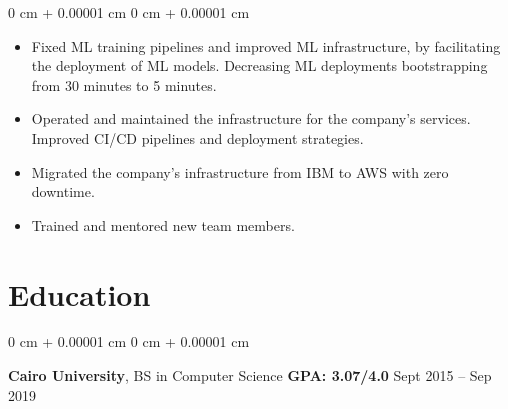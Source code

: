 \documentclass[10pt, letterpaper]{article}
\newenvironment{highlights}{
    \begin{itemize}[
        topsep=0.10 cm,
        parsep=0.10 cm,
        partopsep=0pt,
        itemsep=0pt,
        leftmargin=0 cm + 10pt
    ]
}{
    \end{itemize}
} %
\newenvironment{onecolentry}{
    \begin{adjustwidth}{
        0 cm + 0.00001 cm
    }{
        0 cm + 0.00001 cm
    }
}{
    \end{adjustwidth}
} %
\newenvironment{twocolentry}[2][]{
    \onecolentry
    \def\secondColumn{#2}
    \setcolumnwidth{\fill, 4.5 cm}
    \begin{paracol}{2}
}{
    \switchcolumn \raggedleft \secondColumn
    \end{paracol}
    \endonecolentry
} %
\begin{document}
        \vspace{0.10 cm}
        \begin{onecolentry}
            \begin{highlights}
                \item Fixed ML training pipelines and improved ML infrastructure, by facilitating the deployment of ML models. Decreasing ML deployments bootstrapping from 30 minutes to 5 minutes.
                \item Operated and maintained the infrastructure for the company's services. Improved CI/CD pipelines and deployment strategies.
                \item Migrated the company's infrastructure from IBM to AWS with zero downtime.
                \item Trained and mentored new team members.
            \end{highlights}
        \end{onecolentry}

        \section{Education}
        \begin{twocolentry}{
            Sept 2015 – Sep 2019
        }
        \textbf{Cairo University}, BS in Computer Science \textbf{GPA: 3.07/4.0} \end{twocolentry}


    

            

                
    
\end{document}
